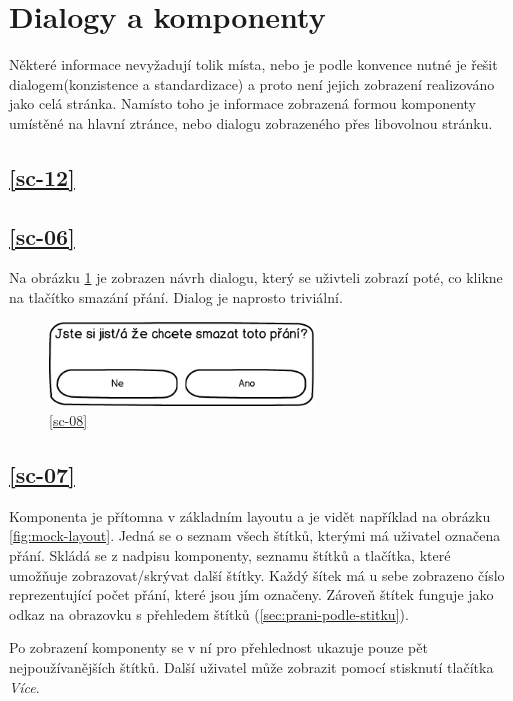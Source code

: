 \section{Dialogy a komponenty}
Některé informace nevyžadují tolik místa, nebo je podle konvence nutné je řešit dialogem(konzistence a standardizace\cite{molich1990improving}) a proto není jejich zobrazení realizováno jako celá stránka. Namísto toho je informace zobrazená formou komponenty umístěné na hlavní ztránce, nebo dialogu zobrazeného přes libovolnou stránku.

\subsection{\ref{sc-12}}

\subsection{\ref{sc-06}}
Na obrázku \ref{fig:dialog-mazani-prani} je zobrazen návrh dialogu, který se uživteli zobrazí poté, co klikne na tlačítko smazání přání. Dialog je naprosto triviální.

\begin{figure}[htb]
\begin{center}
\includegraphics[width=70mm]{./pictures/mock/dialog-mazani-prani.png}
\caption{\ref{sc-08}}
\label{fig:dialog-mazani-prani}
\end{center}
\end{figure}

\subsection{\ref{sc-07}}
Komponenta je přítomna v základním layoutu a je vidět například na obrázku \ref{fig:mock-layout}. Jedná se o seznam všech štítků, kterými má uživatel označena přání. Skládá se z nadpisu komponenty, seznamu štítků a tlačítka, které umožňuje zobrazovat/skrývat další štítky. Každý šítek má u sebe zobrazeno číslo reprezentující počet přání, které jsou jím označeny. Zároveň štítek funguje jako odkaz na obrazovku s přehledem štítků (\ref{sec:prani-podle-stitku}).

Po zobrazení komponenty se v ní pro přehlednost ukazuje pouze pět nejpoužívanějších štítků. Další uživatel může zobrazit pomocí stisknutí tlačítka \emph{Více}.


